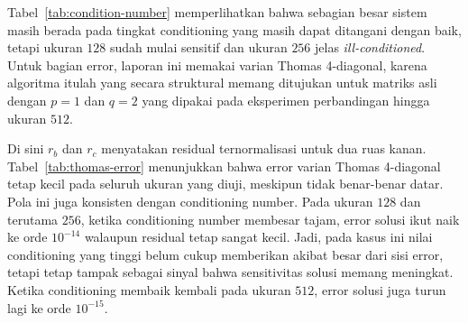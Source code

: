\documentclass[12pt,a4paper]{article}
\begin{document}
Tabel~\ref{tab:condition-number} memperlihatkan bahwa sebagian besar sistem masih berada pada tingkat conditioning yang masih dapat ditangani dengan baik, tetapi ukuran $128$ sudah mulai sensitif dan ukuran $256$ jelas \emph{ill-conditioned}. Untuk bagian error, laporan ini memakai varian Thomas 4-diagonal, karena algoritma itulah yang secara struktural memang ditujukan untuk matriks asli dengan $p=1$ dan $q=2$ yang dipakai pada eksperimen perbandingan hingga ukuran $512$.

\begin{table}[h]
\centering
\caption{Error varian Thomas 4-diagonal pada matriks asli sampai ukuran $512$.}
\label{tab:thomas-error}
\end{table}

Di sini $r_b$ dan $r_c$ menyatakan residual ternormalisasi untuk dua ruas kanan. Tabel~\ref{tab:thomas-error} menunjukkan bahwa error varian Thomas 4-diagonal tetap kecil pada seluruh ukuran yang diuji, meskipun tidak benar-benar datar. Pola ini juga konsisten dengan conditioning number. Pada ukuran $128$ dan terutama $256$, ketika conditioning number membesar tajam, error solusi ikut naik ke orde $10^{-14}$ walaupun residual tetap sangat kecil. Jadi, pada kasus ini nilai conditioning yang tinggi belum cukup memberikan akibat besar dari sisi error, tetapi tetap tampak sebagai sinyal bahwa sensitivitas solusi memang meningkat. Ketika conditioning membaik kembali pada ukuran $512$, error solusi juga turun lagi ke orde $10^{-15}$.
\end{document}
